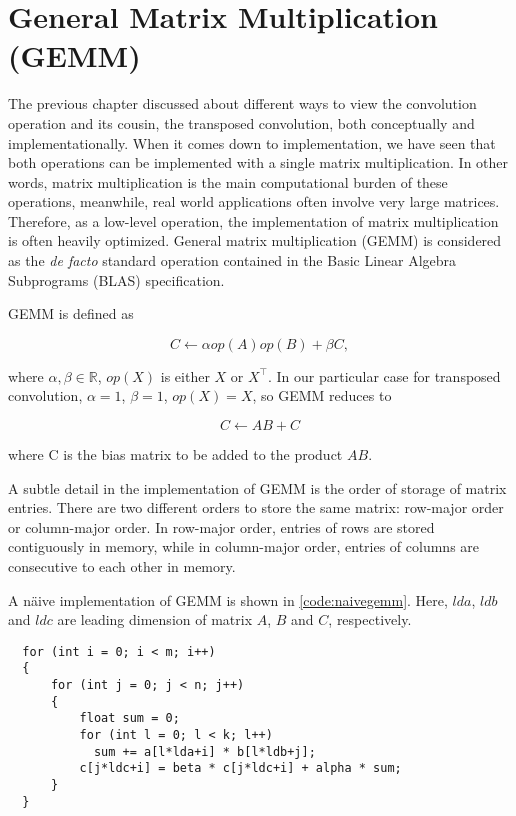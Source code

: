 
\chapter{General Matrix Multiplication (GEMM)}

The previous chapter discussed about different ways to view the convolution operation and its cousin,
the transposed convolution, both conceptually and implementationally. When it comes down to implementation,
we have seen that both operations can be implemented with a single matrix multiplication. In other words,
matrix multiplication is the main computational burden of these operations, meanwhile, real world applications
often involve very large matrices. Therefore, as a low-level operation, the implementation of matrix
multiplication is often heavily optimized. General matrix multiplication (GEMM) is considered as the
\textit{de facto} standard operation contained in the Basic Linear Algebra Subprograms (BLAS)
specification.

GEMM is defined as

$$C \leftarrow \alpha op(A) op(B) + \beta C,$$

where $\alpha, \beta \in \mathbb{R}$, $op(X)$ is either $X$ or $X^\intercal$. In our particular case for transposed convolution, $\alpha = 1$, $\beta = 1$, $op(X) = X$, so GEMM reduces to

$$C \leftarrow A B + C$$

where C is the bias matrix to be added to the product $A B$.

A subtle detail in the implementation of GEMM is the order of storage of matrix entries. There are two
different orders to store the same matrix: row-major order or column-major order. In row-major order,
entries of rows are stored contiguously in memory, while in column-major order, entries of columns are
consecutive to each other in memory.

A näive implementation of GEMM is shown in \ref{code:naivegemm}. Here, $lda$, $ldb$ and $ldc$ are leading
dimension of matrix $A$, $B$ and $C$, respectively.

\begin{code}
  \begin{verbatim}
  for (int i = 0; i < m; i++)
  {
      for (int j = 0; j < n; j++)
      {
          float sum = 0;
          for (int l = 0; l < k; l++)
            sum += a[l*lda+i] * b[l*ldb+j];
          c[j*ldc+i] = beta * c[j*ldc+i] + alpha * sum;
      }
  }
  \end{verbatim}
  \label{code:naivegemm}
\end{code}

\clearpage %

